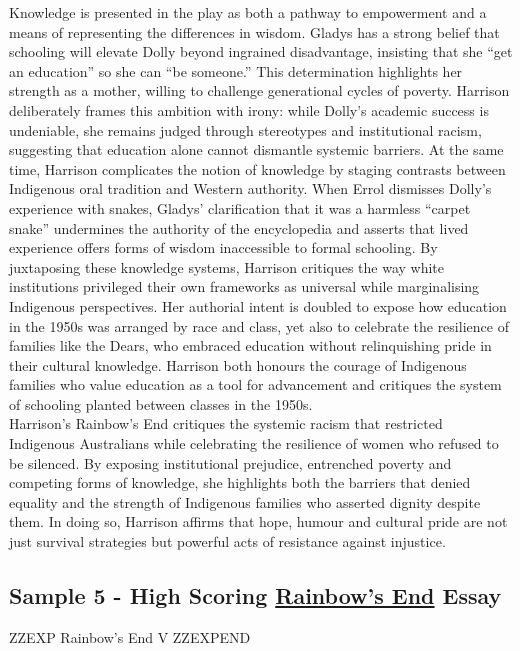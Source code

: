 \documentclass[a4paper]{article}
\begin{document}
Knowledge is presented in the play as both a pathway to empowerment and a means of
representing the differences in wisdom. Gladys has a strong belief that schooling will elevate
Dolly beyond ingrained disadvantage, insisting that she “get an education” so she can “be
someone.” This determination highlights her strength as a mother, willing to challenge
generational cycles of poverty. Harrison deliberately frames this ambition with irony: while
Dolly’s academic success is undeniable, she remains judged through stereotypes and
institutional racism, suggesting that education alone cannot dismantle systemic barriers. At
the same time, Harrison complicates the notion of knowledge by staging contrasts between
Indigenous oral tradition and Western authority. When Errol dismisses Dolly’s experience
with snakes, Gladys’ clarification that it was a harmless “carpet snake” undermines the
authority of the encyclopedia and asserts that lived experience offers forms of wisdom
inaccessible to formal schooling. By juxtaposing these knowledge systems, Harrison
critiques the way white institutions privileged their own frameworks as universal while
marginalising Indigenous perspectives. Her authorial intent is doubled to expose how
education in the 1950s was arranged by race and class, yet also to celebrate the resilience
of families like the Dears, who embraced education without relinquishing pride in their
cultural knowledge. Harrison both honours the courage of Indigenous families who value
education as a tool for advancement and critiques the system of schooling planted between
classes in the 1950s.\\

Harrison’s Rainbow’s End critiques the systemic racism that restricted Indigenous
Australians while celebrating the resilience of women who refused to be silenced. By
exposing institutional prejudice, entrenched poverty and competing forms of knowledge, she
highlights both the barriers that denied equality and the strength of Indigenous families who
asserted dignity despite them. In doing so, Harrison affirms that hope, humour and cultural
pride are not just survival strategies but powerful acts of resistance against injustice.\\

\subsection{Sample 5 - High Scoring \underline{Rainbow's End} Essay}


ZZEXP Rainbow's End V ZZEXPEND
\end{document}
